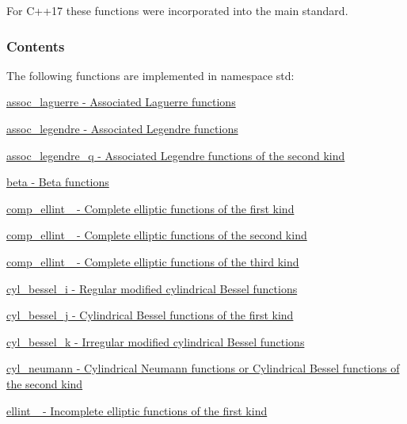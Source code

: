 For C++17 these functions were incorporated into the main standard.\hypertarget{group__mathsf_mathsf_contents}{}\subsubsection{Contents}\label{group__mathsf_mathsf_contents}
The following functions are implemented in namespace {\ttfamily std\+:} 
\begin{DoxyItemize}
\item \hyperlink{group__mathsf__std_ga0b33e0ac3066f2353861ce2f34b43f57}{assoc\+\_\+laguerre -\/ Associated Laguerre functions}
\item \hyperlink{group__mathsf__std_ga7aa4182446f687094b12688078517d53}{assoc\+\_\+legendre -\/ Associated Legendre functions}
\item \hyperlink{group__mathsf__gnu_ga96a1223727fa71ffbf520a98ac3dc885}{assoc\+\_\+legendre\+\_\+q -\/ Associated Legendre functions of the second kind}
\item \hyperlink{group__mathsf__std_gacd36403ae64b89840b1504f97024dcee}{beta -\/ Beta functions}
\item \hyperlink{group__mathsf__std_gad559217fb01e7a8b7a6e23eeedda64be}{comp\+\_\+ellint\+\_ -\/ Complete elliptic functions of the first kind}
\item \hyperlink{group__mathsf__std_gaadf288465eea84ec609d93de96200aaa}{comp\+\_\+ellint\+\_ -\/ Complete elliptic functions of the second kind}
\item \hyperlink{group__mathsf__std_ga80419d323d3231870bd588525e818974}{comp\+\_\+ellint\+\_ -\/ Complete elliptic functions of the third kind}
\item \hyperlink{group__mathsf__std_ga29504b6008798072b0b8d6ea5a50ec60}{cyl\+\_\+bessel\+\_\+i -\/ Regular modified cylindrical Bessel functions}
\item \hyperlink{group__mathsf__std_ga644f7eb975809674db88768f2f115744}{cyl\+\_\+bessel\+\_\+j -\/ Cylindrical Bessel functions of the first kind}
\item \hyperlink{group__mathsf__std_gac73d664b8e7ceba7f8e786c93e97a084}{cyl\+\_\+bessel\+\_\+k -\/ Irregular modified cylindrical Bessel functions}
\item \hyperlink{group__mathsf__std_ga1e4bef23704469b0704cf15c5f04e29e}{cyl\+\_\+neumann -\/ Cylindrical Neumann functions or Cylindrical Bessel functions of the second kind}
\item \hyperlink{group__mathsf__std_ga1550d6947bbbeee9865aabd398102a36}{ellint\+\_ -\/ Incomplete elliptic functions of the first kind}

\end{DoxyItemize}
